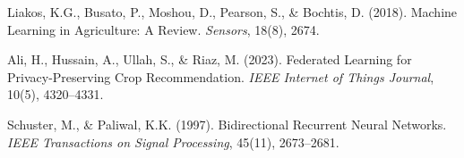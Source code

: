 \documentclass[12pt,a4paper,oneside]{report}
\begin{document}
\begin{singlespacing}
\begin{enumerate}[leftmargin=*, label={[\arabic*]}]
\item Liakos, K.G., Busato, P., Moshou, D., Pearson, S., \& Bochtis, D. (2018). Machine Learning in Agriculture: A Review. \textit{Sensors}, 18(8), 2674.

\item Ali, H., Hussain, A., Ullah, S., \& Riaz, M. (2023). Federated Learning for Privacy-Preserving Crop Recommendation. \textit{IEEE Internet of Things Journal}, 10(5), 4320--4331.

\item Schuster, M., \& Paliwal, K.K. (1997). Bidirectional Recurrent Neural Networks. \textit{IEEE Transactions on Signal Processing}, 45(11), 2673--2681.

\end{enumerate}
\end{singlespacing}
\end{document}
